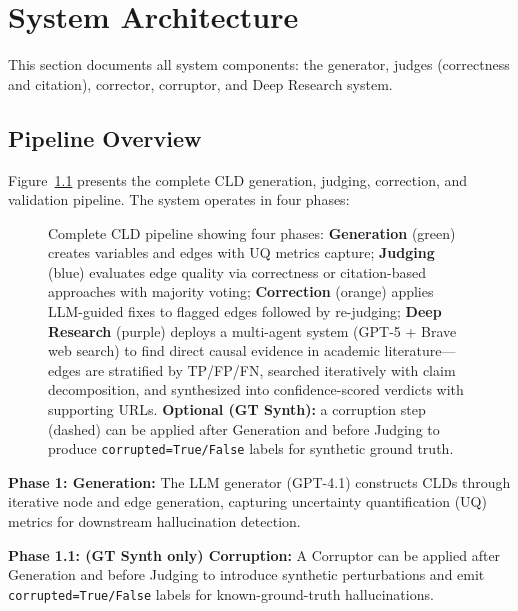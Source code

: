 \chapter{System Architecture}
\label{sec:system_architecture}

This section documents all system components: the generator, judges (correctness and citation), corrector, corruptor, and Deep Research system.

\section{Pipeline Overview}
\label{sec:methods_system_overview}

Figure~\ref{fig:cld_pipeline} presents the complete CLD generation, judging, correction, and validation pipeline. The system operates in four phases:

\begin{figure}[H]
\centering
\vspace{-0.35em}
\captionsetup{font=small}
\resizebox{\textwidth}{!}{%

}
\vspace{-0.35em}
\caption[CLD pipeline overview]{Complete CLD pipeline showing four phases: \textbf{Generation} (green) creates variables and edges with UQ metrics capture; \textbf{Judging} (blue) evaluates edge quality via correctness or citation-based approaches with majority voting; \textbf{Correction} (orange) applies LLM-guided fixes to flagged edges followed by re-judging; \textbf{Deep Research} (purple) deploys a multi-agent system (GPT-5 + Brave web search) to find direct causal evidence in academic literature---edges are stratified by TP/FP/FN, searched iteratively with claim decomposition, and synthesized into confidence-scored verdicts with supporting URLs. \textbf{Optional (GT Synth):} a corruption step (dashed) can be applied after Generation and before Judging to produce \texttt{corrupted=True/False} labels for synthetic ground truth.}
\label{fig:cld_pipeline}
\end{figure}

\textbf{Phase 1: Generation:} The LLM generator (GPT-4.1) constructs CLDs through iterative node and edge generation, capturing uncertainty quantification (UQ) metrics for downstream hallucination detection.

\textbf{Phase 1.1: (GT Synth only) Corruption:} A Corruptor can be applied after Generation and before Judging to introduce synthetic perturbations and emit \texttt{corrupted=True/False} labels for known-ground-truth hallucinations.

